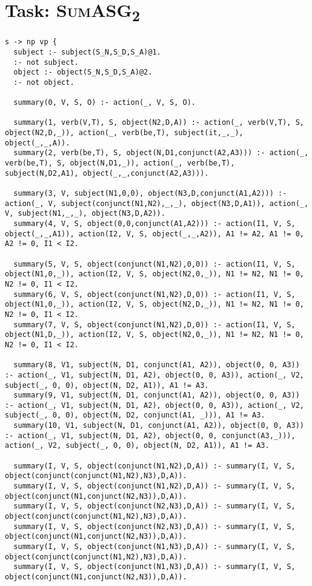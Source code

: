 \vspace{5pt}

\section{Task: \textsc{SumASG\textsubscript{2}}}
\label{sec:appendix_asg_2}

\begin{lstlisting}
s -> np vp {
  subject :- subject(S_N,S_D,S_A)@1.
  :- not subject.
  object :- object(S_N,S_D,S_A)@2.
  :- not object.

  summary(0, V, S, O) :- action(_, V, S, O).

  summary(1, verb(V,T), S, object(N2,D,A)) :- action(_, verb(V,T), S, object(N2,D,_)), action(_, verb(be,T), subject(it,_,_), object(_,_,A)).
  summary(2, verb(be,T), S, object(N,D1,conjunct(A2,A3))) :- action(_, verb(be,T), S, object(N,D1,_)), action(_, verb(be,T), subject(N,D2,A1), object(_,_,conjunct(A2,A3))).

  summary(3, V, subject(N1,0,0), object(N3,D,conjunct(A1,A2))) :- action(_, V, subject(conjunct(N1,N2),_,_), object(N3,D,A1)), action(_, V, subject(N1,_,_), object(N3,D,A2)).
  summary(4, V, S, object(0,0,conjunct(A1,A2))) :- action(I1, V, S, object(_,_,A1)), action(I2, V, S, object(_,_,A2)), A1 != A2, A1 != 0, A2 != 0, I1 < I2.

  summary(5, V, S, object(conjunct(N1,N2),0,0)) :- action(I1, V, S, object(N1,0,_)), action(I2, V, S, object(N2,0,_)), N1 != N2, N1 != 0, N2 != 0, I1 < I2.
  summary(6, V, S, object(conjunct(N1,N2),D,0)) :- action(I1, V, S, object(N1,0,_)), action(I2, V, S, object(N2,D,_)), N1 != N2, N1 != 0, N2 != 0, I1 < I2.
  summary(7, V, S, object(conjunct(N1,N2),D,0)) :- action(I1, V, S, object(N1,D,_)), action(I2, V, S, object(N2,0,_)), N1 != N2, N1 != 0, N2 != 0, I1 < I2.

  summary(8, V1, subject(N, D1, conjunct(A1, A2)), object(0, 0, A3)) :- action(_, V1, subject(N, D1, A2), object(0, 0, A3)), action(_, V2, subject(_, 0, 0), object(N, D2, A1)), A1 != A3.
  summary(9, V1, subject(N, D1, conjunct(A1, A2)), object(0, 0, A3)) :- action(_, V1, subject(N, D1, A2), object(0, 0, A3)), action(_, V2, subject(_, 0, 0), object(N, D2, conjunct(A1, _))), A1 != A3.
  summary(10, V1, subject(N, D1, conjunct(A1, A2)), object(0, 0, A3)) :- action(_, V1, subject(N, D1, A2), object(0, 0, conjunct(A3,_))), action(_, V2, subject(_, 0, 0), object(N, D2, A1)), A1 != A3.

  summary(I, V, S, object(conjunct(N1,N2),D,A)) :- summary(I, V, S, object(conjunct(conjunct(N1,N2),N3),D,A)).
  summary(I, V, S, object(conjunct(N1,N2),D,A)) :- summary(I, V, S, object(conjunct(N1,conjunct(N2,N3)),D,A)).
  summary(I, V, S, object(conjunct(N2,N3),D,A)) :- summary(I, V, S, object(conjunct(conjunct(N1,N2),N3),D,A)).
  summary(I, V, S, object(conjunct(N2,N3),D,A)) :- summary(I, V, S, object(conjunct(N1,conjunct(N2,N3)),D,A)).
  summary(I, V, S, object(conjunct(N1,N3),D,A)) :- summary(I, V, S, object(conjunct(conjunct(N1,N2),N3),D,A)).
  summary(I, V, S, object(conjunct(N1,N3),D,A)) :- summary(I, V, S, object(conjunct(N1,conjunct(N2,N3)),D,A)).


\end{lstlisting}
